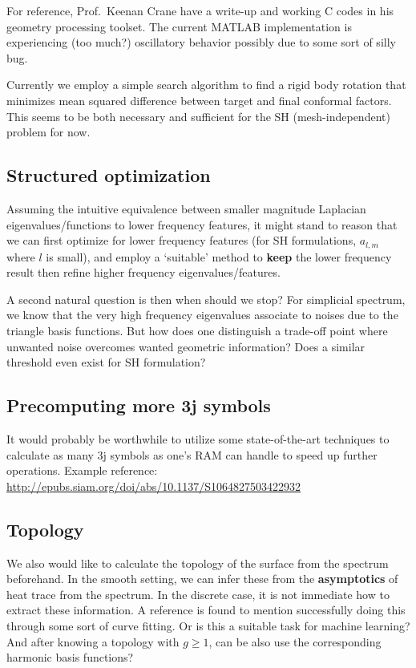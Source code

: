 \documentclass[11pt]{article}
\theoremstyle{definition}
\begin{document}
For reference, Prof.~Keenan Crane have a write-up and working C codes in his geometry processing toolset. The current MATLAB implementation is experiencing (too much?) oscillatory behavior possibly due to some sort of silly bug.

Currently we employ a simple search algorithm to find a rigid body rotation that minimizes mean squared difference between target and final conformal factors. This seems to be both necessary and sufficient for the SH (mesh-independent) problem for now.

\subsection{Structured optimization}
Assuming the intuitive equivalence between smaller magnitude Laplacian eigenvalues/functions to lower frequency features, it might stand to reason that we can first optimize for lower frequency features (for SH formulations, $a_{l,m}$ where $l$ is small), and employ a `suitable' method to \textbf{keep} the lower frequency result then refine higher frequency eigenvalues/features.

A second natural question is then when should we stop? For simplicial spectrum, we know that the very high frequency eigenvalues associate to noises due to the triangle basis functions. But how does one distinguish a trade-off point where unwanted noise overcomes wanted geometric information? Does a similar threshold even exist for SH formulation?

\subsection{Precomputing more 3j symbols}
It would probably be worthwhile to utilize some state-of-the-art techniques to calculate as many 3j symbols as one's RAM can handle to speed up further operations. 
Example reference: 
\url{http://epubs.siam.org/doi/abs/10.1137/S1064827503422932}

\subsection{Topology}
We also would like to calculate the topology of the surface from the spectrum beforehand. In the smooth setting, we can infer these from the \textbf{asymptotics} of heat trace from the spectrum. In the discrete case, it is not immediate how to extract these information. A reference is found to mention successfully doing this through some sort of curve fitting. Or is this a suitable task for machine learning? And after knowing a topology with $g\geq1$, can be also use the corresponding harmonic basis functions?
\end{document}
